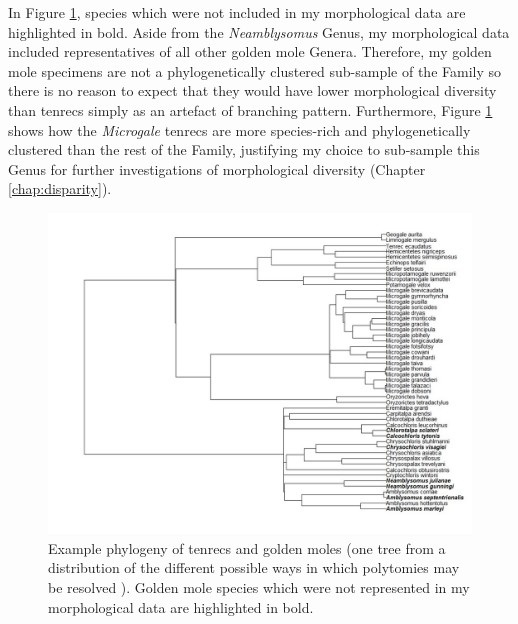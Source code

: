 In Figure \ref{fig:phylo}, species which were not included in my morphological data are highlighted in bold. Aside from the \textit{Neamblysomus} Genus, my morphological data included representatives of all other golden mole Genera. Therefore, my golden mole specimens are not a phylogenetically clustered sub-sample of the Family so there is no reason to expect that they would have lower morphological diversity than tenrecs simply as an artefact of branching pattern. 
Furthermore, Figure \ref{fig:phylo} shows how the \textit{Microgale} tenrecs are more species-rich and phylogenetically clustered than the rest of the Family, justifying my choice to sub-sample this Genus for further investigations of morphological diversity (Chapter \ref{chap:disparity}).



 
\begin{landscape}
\begin{figure}[h] 
  \centering
  \includegraphics[width=\textwidth, height=\textheight, keepaspectratio=true]{Appendix/tc+gm_phylo.jpg}
    \caption[Example phylogeny of tenrecs and golden moles]
    {Example phylogeny of tenrecs and golden moles (one tree from a distribution of the different possible ways in which polytomies may be resolved \citep{Kuhn2011}). Golden mole species which were not represented in my morphological data are highlighted in bold. }
  \label{fig:phylo}
  \end{figure}
 \end{landscape}